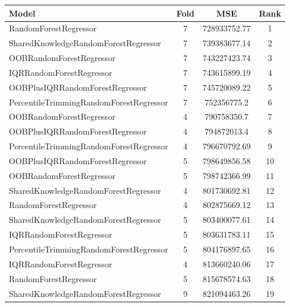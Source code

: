\begin{table}[h]
\centering
\begin{tabular}{|l|c|c|c|}
\hline
Model & Fold & MSE & Rank \\ \hline
\textcolor[HTML]{87bc45}{RandomForestRegressor} & 7 & 728933752.77 & 1 \\ \hline
\textcolor[HTML]{ef9b20}{SharedKnowledgeRandomForestRegressor} & 7 & 739383677.14 & 2 \\ \hline
\textcolor[HTML]{b33dc6}{OOBRandomForestRegressor} & 7 & 743227423.74 & 3 \\ \hline
\textcolor[HTML]{27aeef}{IQRRandomForestRegressor} & 7 & 743615899.19 & 4 \\ \hline
\textcolor[HTML]{ede15b}{OOBPlusIQRRandomForestRegressor} & 7 & 745720089.22 & 5 \\ \hline
\textcolor[HTML]{f46a9b}{PercentileTrimmingRandomForestRegressor} & 7 & 752356775.2 & 6 \\ \hline
\textcolor[HTML]{b33dc6}{OOBRandomForestRegressor} & 4 & 790758350.7 & 7 \\ \hline
\textcolor[HTML]{ede15b}{OOBPlusIQRRandomForestRegressor} & 4 & 794872013.4 & 8 \\ \hline
\textcolor[HTML]{f46a9b}{PercentileTrimmingRandomForestRegressor} & 4 & 796670792.69 & 9 \\ \hline
\textcolor[HTML]{ede15b}{OOBPlusIQRRandomForestRegressor} & 5 & 798649856.58 & 10 \\ \hline
\textcolor[HTML]{b33dc6}{OOBRandomForestRegressor} & 5 & 798742366.99 & 11 \\ \hline
\textcolor[HTML]{ef9b20}{SharedKnowledgeRandomForestRegressor} & 4 & 801730692.81 & 12 \\ \hline
\textcolor[HTML]{87bc45}{RandomForestRegressor} & 4 & 802875669.12 & 13 \\ \hline
\textcolor[HTML]{ef9b20}{SharedKnowledgeRandomForestRegressor} & 5 & 803400077.61 & 14 \\ \hline
\textcolor[HTML]{27aeef}{IQRRandomForestRegressor} & 5 & 803631783.11 & 15 \\ \hline
\textcolor[HTML]{f46a9b}{PercentileTrimmingRandomForestRegressor} & 5 & 804176897.65 & 16 \\ \hline
\textcolor[HTML]{27aeef}{IQRRandomForestRegressor} & 4 & 813660240.06 & 17 \\ \hline
\textcolor[HTML]{87bc45}{RandomForestRegressor} & 5 & 815678574.63 & 18 \\ \hline
\textcolor[HTML]{ef9b20}{SharedKnowledgeRandomForestRegressor} & 9 & 821094463.26 & 19 \\ \hline

\end{tabular}
\end{table}
